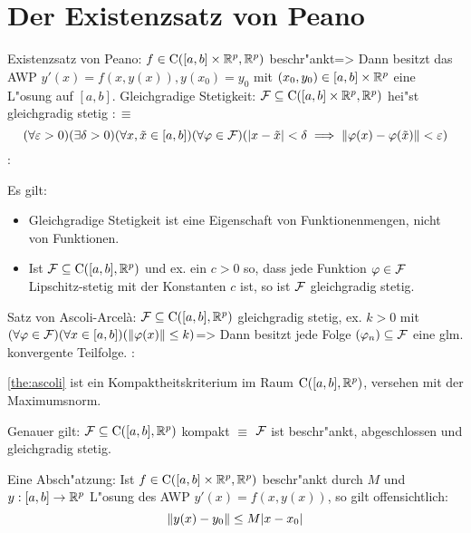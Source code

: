 \section{Der Existenzsatz von Peano}
\theorem Existenzsatz von Peano:
  $f\in\SetCont([a,b]\times\SetR^p,\SetR^p)$ beschr"ankt=>{
  \label{the:peano}
  Dann besitzt das AWP $y'(x)=f(x,y(x)),y(x_0)=y_0$ mit 
  $(x_0,y_0)\in[a,b]\times\SetR^p$ eine L"osung auf $[a,b]$.
  }
 Gleichgradige Stetigkeit:{
  $\cal F\subseteq\SetCont([a,b]\times\SetR^p,\SetR^p)$ hei"st 
  gleichgradig stetig $:\equiv$
  \[\epsn(\exists \delta>0)(\forall x,\tilde x\in[a,b])(\forall \phi\in\cal F)
    (|x-\tilde x|<\delta \implies \norm{\phi(x)-\phi(\tilde x)}<\epsilon)
    \]
  }
\remark:{
  Es gilt:
  \begin{itemize}
    \item Gleichgradige Stetigkeit ist eine Eigenschaft von Funktionenmengen,
      nicht von Funktionen.
    \item Ist $\cal F\subseteq\SetCont([a,b],\SetR^p)$ und ex. ein $c>0$ so,
      dass jede Funktion $\phi\in\cal F$ Lipschitz-stetig mit der Konstanten
      $c$ ist, so ist $\cal F$ gleichgradig stetig.
    \end{itemize}
  }
\theorem Satz von Ascoli-Arcel{\`a}:
  $\cal F\subseteq\SetCont([a,b],\SetR^p)$ gleichgradig stetig, ex. $k>0$ mit
  $(\forall \phi\in\cal F)(\forall x\in[a,b])(\norm{\phi(x)}\leq k)$=>{
  \label{the:ascoli}
  Dann besitzt jede Folge $(\phi_n)\subseteq\cal F$ eine glm. konvergente
  Teilfolge.
  }
\remark:{
  \ref{the:ascoli} ist ein Kompaktheitskriterium im Raum 
  $\SetCont([a,b],\SetR^p)$, versehen mit der Maximumsnorm.
  
  Genauer gilt: $\cal F \subseteq\SetCont([a,b],\SetR^p)$ kompakt $\equiv$
  $\cal F$ ist beschr"ankt, abgeschlossen und gleichgradig stetig.
  }
\remark Eine Absch"atzung:{
  Ist $f\in\SetCont([a,b]\times\SetR^p,\SetR^p)$ beschr"ankt durch $M$ und
  $y:[a,b]\to\SetR^p$ L"osung des AWP $y'(x)=f(x,y(x))$, so gilt 
  offensichtlich:
  \[\norm{y(x)-y_0}\leq M|x-x_0|
    \]
  }
